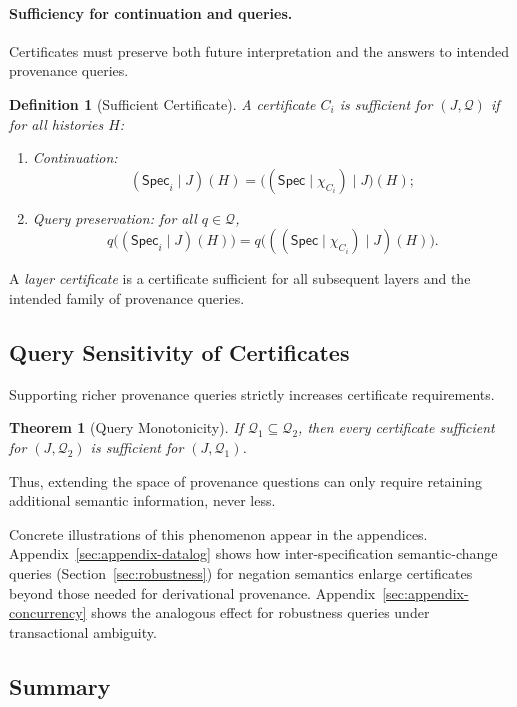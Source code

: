 \documentclass[acmsmall,nonacm]{acmart}
\newtheorem{definition}{Definition}
\newtheorem{theorem}{Theorem}
\theoremstyle{remark}
\numberwithin{definition}{section}
\numberwithin{theorem}{section}
\numberwithin{lemma}{section}
\numberwithin{corollary}{section}
\numberwithin{remark}{section}
\numberwithin{example}{section}
\numberwithin{observation}{section}
\numberwithin{assumption}{section}
\newcommand{\Spec}{\mathsf{Spec}}
\begin{document}
\paragraph{Sufficiency for continuation and queries.}
Certificates must preserve both future interpretation and the answers to intended
provenance queries.

\begin{definition}[Sufficient Certificate]
A certificate $C_i$ is \emph{sufficient for $(J,\mathcal{Q})$} if for all histories
$H$:
\begin{enumerate}
  \item \emph{Continuation:}
  \[
    (\Spec_i \mid J)(H)
    =
    \bigl((\Spec \mid \chi_{C_i}) \mid J\bigr)(H);
  \]
  \item \emph{Query preservation:} for all $q \in \mathcal{Q}$,
  \[
    q\bigl((\Spec_i \mid J)(H)\bigr)
    =
    q\bigl(((\Spec \mid \chi_{C_i}) \mid J)(H)\bigr).
  \]
\end{enumerate}
\end{definition}

A \emph{layer certificate} is a certificate sufficient for all subsequent layers
and the intended family of provenance queries.

\subsection{Query Sensitivity of Certificates}

Supporting richer provenance queries strictly increases certificate requirements.

\begin{theorem}[Query Monotonicity]
If $\mathcal{Q}_1 \subseteq \mathcal{Q}_2$, then every certificate sufficient for
$(J,\mathcal{Q}_2)$ is sufficient for $(J,\mathcal{Q}_1)$.
\end{theorem}

\noindent
Thus, extending the space of provenance questions can only require retaining
additional semantic information, never less.

Concrete illustrations of this phenomenon appear in the appendices.
Appendix~\ref{sec:appendix-datalog} shows how inter-specification semantic-change queries
(Section~\ref{sec:robustness}) for negation semantics enlarge certificates beyond
those needed for derivational provenance.
Appendix~\ref{sec:appendix-concurrency} shows the analogous effect for robustness
queries under transactional ambiguity.

\subsection{Summary}
\end{document}
